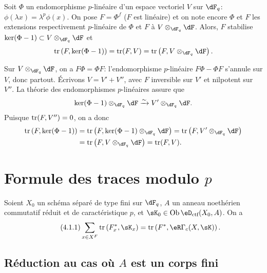 \begin{lemma_}\label{III:3-8}
Soit $\Phi$ un endomorphisme $p$-linéaire d'un espace vectoriel $V$ sur 
$\dF_q$: $\phi(\lambda x) = \lambda^p\phi(x)$. On pose $F=\Phi^f$ ($F$ est 
linéaire) et on note encore $\Phi$ et $F$ les extensions respectivement 
$p$-linéaire de $\Phi$ et $F$ à $V\otimes_{\dF_q}\dF$. Alors, $F$ stabilise 
$\ker(\Phi-1)\subset V\otimes_{\dF_q}\dF$ et 
\[
  \tr\left(F,\ker(\Phi-1)\right) = \tr(F,V) = \tr\left(F,V\otimes_{\dF_q}\dF\right) \text{.}
\]
\end{lemma_}

Sur $V\otimes_{\dF_q}\dF$, on a $F\Phi = \Phi F$: l'endomorphisme $p$-linéaire 
$F\Phi-\Phi F$ s'annule sur $V$, donc partout. Écrivons $V=V'+V''$, avec $F$ 
inversible sur $V'$ et nilpotent sur $V''$. La théorie des endomorphismes 
$p$-linéaires assure que 
\[
  \ker(\Phi-1)\otimes_{\dF_q}\dF \iso V'\otimes_{\dF_q}\dF \text{.}
\]
Puisque $\operatorname{tr}(F,V'') = 0$, on a donc 
\begin{align*}
  \tr\left(F,\ker(\Phi-1)\right) 
    &= \tr\left(F,\ker(\Phi-1)\otimes_{\dF_q}\dF\right) = \tr\left(F,V'\otimes_{\dF_q}\dF\right) \\
    &= \tr\left(F,V\otimes_{\dF_q}\dF\right) = \tr(F,V) \text{.}
\end{align*}










\section{Formule des traces modulo \texorpdfstring{$p$}{p}}\label{III:4}





\begin{theorem_}\label{III:4-1}
Soient $X_0$ un schéma séparé de type fini sur $\dF_q$, $A$ un anneau 
noethérien commutatif réduit et de caractéristique $p$, et 
$\sK_0\in\ob\eD_\textnormal{ctf}(X_0,A)$. On a 
\begin{equation*}\tag{4.1.1}\label{III:eq:4-1-1}
  \sum_{x\in X^F} \tr\left(F_x^*,\sK_x\right) = \tr\left(F^*,\eR\Gamma_c(X,\sK)\right) \text{.}
\end{equation*}
\end{theorem_}





\subsection{Réduction au cas où \texorpdfstring{$A$}{A} est un corps fini}\label{III:4-2}

